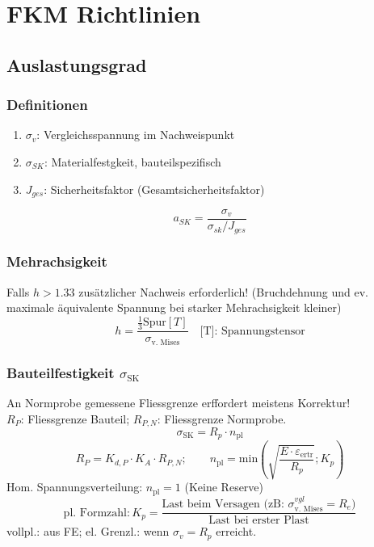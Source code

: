 \vspace{-2mm}
\section{FKM Richtlinien}{}
    \subsection{Auslastungsgrad}
     
        \subsubsection{Definitionen}
            \begin{enumerate}[noitemsep]
                \item $\sigma_{v}$: Vergleichsspannung im Nachweispunkt
                \item $\sigma_{SK}$: Materialfestgkeit, bauteilspezifisch
                \item $J_{ges}$: Sicherheitsfaktor (Gesamtsicherheitsfaktor)
            \end{enumerate}
            \vspace{-1mm}\[\boxed{a_{SK} = \frac{\sigma_{v}}{\sigma_{sk}/J_{ges}}}\]
    
        \subsubsection{Mehrachsigkeit}
            Falls $h > 1.33$ zusätzlicher Nachweis erforderlich! (Bruchdehnung und ev. maximale äquivalente Spannung bei starker Mehrachsigkeit kleiner)
            \vspace{-2mm}\[\boxed{h = \frac{\frac{1}{3} \textrm{Spur}[T]}{\sigma_{\textrm{v. Mises}}}} \quad \textrm{[T]: Spannungstensor}\]
        \subsubsection{Bauteilfestigkeit $\sigma_{\textrm{SK}}$}
            An Normprobe gemessene Fliessgrenze erffordert meistens Korrektur! \\$R_P$: Fliessgrenze Bauteil; $R_{P,N}$: Fliessgrenze Normprobe.
            \[\boxed{\sigma_\textrm{SK}=R_p\cdot n_{\textrm{pl}}}\]
            \[R_P = K_{d,P}\cdot K_A\cdot R_{P,N};\qquad n_{\textrm{pl}}=\textrm{min} \left( \sqrt{ \frac{E\cdot\varepsilon_{\textrm{ertr}}}{R_p}};K_p \right)\]
            Hom. Spannungsverteilung: $n_{\textrm{pl}}=1$ (Keine Reserve)
            \vspace{-1mm}
            \[\textrm{pl. Formzahl}: \boxed{K_p  = \frac{\textrm{Last beim Versagen 
            (zB: }\sigma_{\textrm{v. Mises}}^{vgl}=R_e\textrm{)}}{\textrm{Last bei erster Plast}}}\]
            vollpl.: aus FE; el. Grenzl.: wenn $\sigma_v = R_p$ erreicht.
